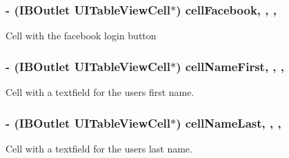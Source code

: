 \subsubsection[{cell\+Facebook}]{\setlength{\rightskip}{0pt plus 5cm}-\/ (I\+B\+Outlet U\+I\+Table\+View\+Cell$\ast$) cell\+Facebook\hspace{0.3cm}{\ttfamily [read]}, {\ttfamily [write]}, {\ttfamily [nonatomic]}, {\ttfamily [strong]}}\label{interface_e_s_sign_up_view_controller_ac5c18ba93680443520df0247de8ac481}
Cell with the facebook login button \hypertarget{interface_e_s_sign_up_view_controller_aa5e9680c08dd216bb4c763a99e6b87f9}{}
\subsubsection[{cell\+Name\+First}]{\setlength{\rightskip}{0pt plus 5cm}-\/ (I\+B\+Outlet U\+I\+Table\+View\+Cell$\ast$) cell\+Name\+First\hspace{0.3cm}{\ttfamily [read]}, {\ttfamily [write]}, {\ttfamily [nonatomic]}, {\ttfamily [strong]}}\label{interface_e_s_sign_up_view_controller_aa5e9680c08dd216bb4c763a99e6b87f9}
Cell with a textfield for the user\textquotesingle{}s first name. \hypertarget{interface_e_s_sign_up_view_controller_a0bfaa1c24d2e8b3b19c707e8a34639b2}{}
\subsubsection[{cell\+Name\+Last}]{\setlength{\rightskip}{0pt plus 5cm}-\/ (I\+B\+Outlet U\+I\+Table\+View\+Cell$\ast$) cell\+Name\+Last\hspace{0.3cm}{\ttfamily [read]}, {\ttfamily [write]}, {\ttfamily [nonatomic]}, {\ttfamily [strong]}}\label{interface_e_s_sign_up_view_controller_a0bfaa1c24d2e8b3b19c707e8a34639b2}
Cell with a textfield for the user\textquotesingle{}s last name. \hypertarget{interface_e_s_sign_up_view_controller_a55e541f4d1da8d33c9baf5bfc5925583}{}
